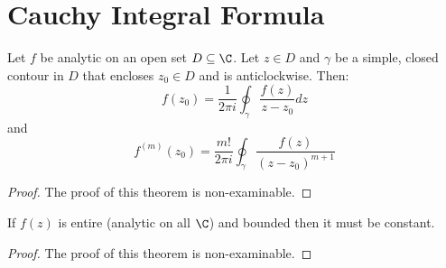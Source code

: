 \documentclass[../Main.tex]{subfiles}
\begin{document}
\section{Cauchy Integral Formula}
\begin{theorem}
    Let $f$ be analytic on an open set $D \subseteq \C$. Let $z \in D$ and $\gamma$ be a simple, closed contour in $D$ that encloses $z_0 \in D$ and is anticlockwise. Then:
    \begin{equation*}
        f(z_0) = \frac{1}{2\pi i} \oint_\gamma \frac{f(z)}{z - z_0} dz
    \end{equation*}
    and
    \begin{equation*}
        f^{(m)}(z_0) = \frac{m!}{2\pi i} \oint_{\gamma} \frac{f(z)}{(z - z_0)^{m+1}}
    \end{equation*}
    \label{thmCauchyIntegral}
\end{theorem}
\begin{proof}
    The proof of this theorem is non-examinable.
\end{proof}
\begin{theorem}
    If $f(z)$ is entire (analytic on all $\C$) and bounded then it must be constant.
    \label{thmEntireBddConst}
\end{theorem}
\begin{proof}
    The proof of this theorem is non-examinable.
\end{proof}
\end{document}
